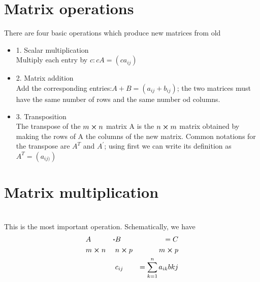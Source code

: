 \documentclass{article}
\begin{document}
    \section{Matrix operations}
    There are four basic operations which produce new matrices from old
    \begin{itemize}
        \item 1. Scalar multiplication\\
        Multiply each entry by $c: cA=(ca_{ij})$
        \item 2. Matrix addition\\
        Add the corresponding entries:$A + B = (a_{ij} + b_{ij})$; the two matrices must have the same number of rows and the same number od columns.
        \item 3. Transposition\\
        The transpose of the $m \cross n$ matrix A is the $n \cross m$ matrix obtained by making the rows of A the columns of the new matrix. Common notations for the transpose are $A^T$ and $A^\prime$; using first we can write its definition as $A^T = (a_{ij)})$
    \end{itemize}

    \section{Matrix multiplication}\\
    This is the most important operation. Schematically, we have\\

    \begin{align*}
        & A & \vdot & B & = C\\
        & m \cross n & & n \cross p & m \cross p\\
        & & & c_{ij} & = \sum_{k=1}^n a_{ik}b{kj}
    \end{align*}
\end{document}
